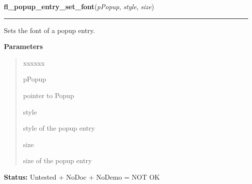     \label{xformslib:library:fl_popup_entry_set_font}

    \vspace{0.5ex}

\hspace{.8\funcindent}\begin{boxedminipage}{\funcwidth}

    \raggedright \textbf{fl\_popup\_entry\_set\_font}(\textit{pPopup}, \textit{style}, \textit{size})

    \vspace{-1.5ex}

    \rule{\textwidth}{0.5\fboxrule}
\setlength{\parskip}{2ex}
    Sets the font of a popup entry.

\setlength{\parskip}{1ex}
      \textbf{Parameters}
      \vspace{-1ex}

      \begin{quote}
        \begin{Ventry}{xxxxxx}

          \item[pPopup]

          pointer to Popup

          \item[style]

          style of the popup entry

          \item[size]

          size of the popup entry

        \end{Ventry}

      \end{quote}

\textbf{Status:} Untested + NoDoc + NoDemo = NOT OK



    \end{boxedminipage}

    \label{xformslib:library:fl_popup_get_bw}

    \vspace{0.5ex}

